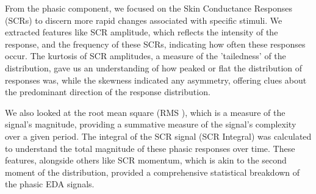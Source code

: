 From the phasic component, we focused on the Skin Conductance Responses (SCRs) to discern more rapid changes associated with specific stimuli. We extracted features like SCR amplitude, which reflects the intensity of the response, and the frequency of these SCRs, indicating how often these responses occur. The kurtosis of SCR amplitudes, a measure of the 'tailedness' of the distribution, gave us an understanding of how peaked or flat the distribution of responses was, while the skewness indicated any asymmetry, offering clues about the predominant direction of the response distribution.

We also looked at the root mean square (RMS ), which is a measure of the signal's magnitude, providing a summative measure of the signal's complexity over a given period. The integral of the SCR signal (SCR Integral) was calculated to understand the total magnitude of these phasic responses over time. These features, alongside others like SCR momentum, which is akin to the second moment of the distribution, provided a comprehensive statistical breakdown of the phasic EDA signals.

